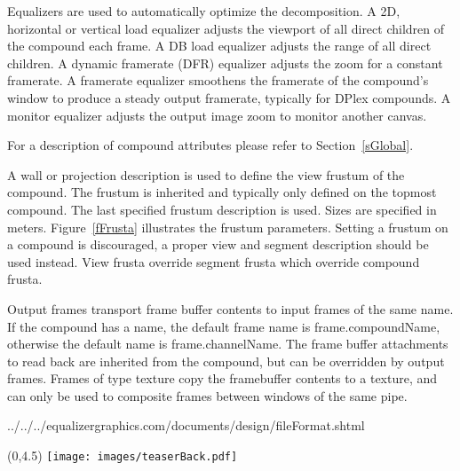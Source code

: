 \documentclass[10pt,a4]{scrartcl}
\newcommand{\fig}[1]{Figure~\ref{#1}}
\newcommand{\sref}[1]{Section~\ref{#1}}
\begin{document}
Equalizers are used to automatically optimize the decomposition. A 2D,
horizontal or vertical load equalizer adjusts the viewport of all direct
children of the compound each frame. A DB load equalizer adjusts the
range of all direct children. A dynamic framerate (DFR) equalizer adjusts
the zoom for a constant framerate. A framerate equalizer
smoothens the framerate of the compound's window to produce a steady
output framerate, typically for DPlex compounds. A monitor equalizer
adjusts the output image zoom to monitor another canvas.

For a description of compound attributes please refer to \sref{sGlobal}.

A wall or projection description is used to define the view frustum of
the compound. The frustum is inherited and typically only defined on the
topmost compound. The last specified frustum description is used. Sizes
are specified in meters. \fig{fFrusta} illustrates the frustum
parameters. Setting a frustum on a compound is discouraged, a proper view and
segment description should be used instead. View frusta override segment frusta
which override compound frusta.

Output frames transport frame buffer contents to input frames of the
same name. If the compound has a name, the default frame name is
\textsf{frame.compoundName}, otherwise the default name is
\textsf{frame.channelName}. The frame buffer attachments to read back
are inherited from the compound, but can be overridden by output
frames. Frames of type \textsf{texture} copy the framebuffer contents to
a texture, and can only be used to composite frames between windows of
the same pipe.

{\footnotesize
  {../../../equalizergraphics.com/documents/design/fileFormat.shtml}}

\cleardoublepage
\pagestyle{empty}
\begin{textblock}{}(0,4.5)
  \hspace{-1cm}\texttt{[image: images/teaserBack.pdf]}
\end{textblock}
\end{document}
